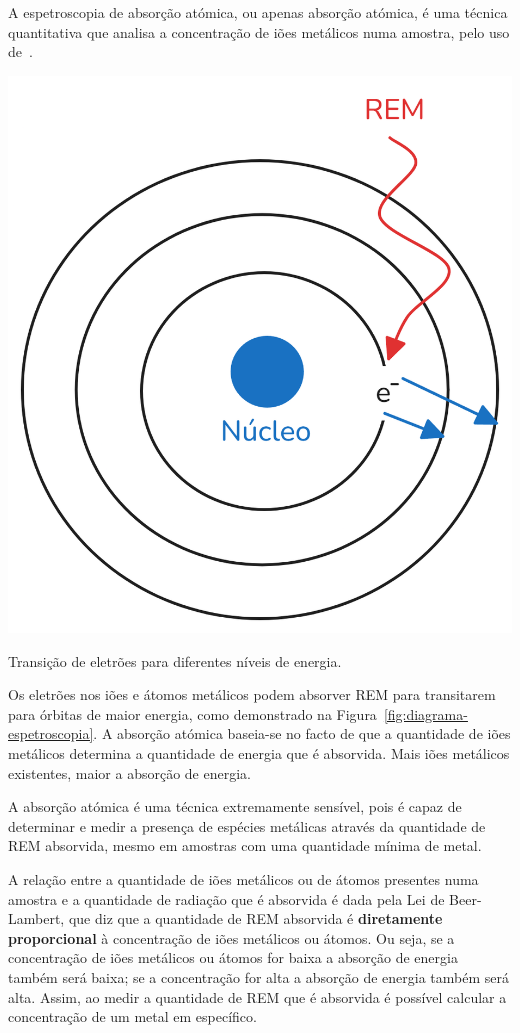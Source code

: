 A espetroscopia de absorção atómica, ou apenas absorção atómica, é uma técnica quantitativa que analisa a concentração de iões metálicos numa amostra, pelo uso de~.

\begin{marginfigure}
    \centering
    \includegraphics[width=0.8\linewidth]{figures/Diagrama - espetroscopia}
    \caption{Transição de eletrões para diferentes níveis de energia.}
    \label{fig:diagrama-espetroscopia}
\end{marginfigure}

Os eletrões nos iões e átomos metálicos podem absorver REM para transitarem para órbitas de maior energia, como demonstrado na Figura~\ref{fig:diagrama-espetroscopia}.
A absorção atómica baseia-se no facto de que a quantidade de iões metálicos determina a quantidade de energia que é absorvida.
Mais iões metálicos existentes, maior a absorção de energia.

A absorção atómica é uma técnica extremamente sensível, pois é capaz de determinar e medir a presença de espécies metálicas através da quantidade de REM absorvida, mesmo em amostras com uma quantidade mínima de metal.

A relação entre a quantidade de iões metálicos ou de átomos presentes numa amostra e a quantidade de radiação que é absorvida é dada pela Lei de Beer-Lambert, que diz que a quantidade de REM absorvida é \textbf{diretamente proporcional} à concentração de iões metálicos ou átomos.
Ou seja, se a concentração de iões metálicos ou átomos for baixa a absorção de energia também será baixa; se a concentração for alta a absorção de energia também será alta.
Assim, ao medir a quantidade de REM que é absorvida é possível calcular a concentração de um metal em específico.

